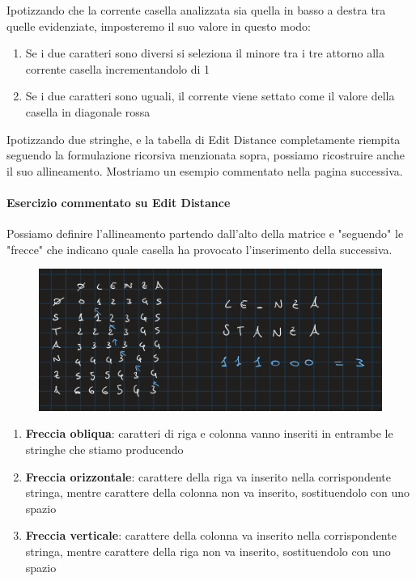\documentclass{article}
\begin{document}
Ipotizzando che la corrente casella analizzata sia quella in basso a destra tra quelle evidenziate, imposteremo il suo valore in questo modo:

\begin{enumerate}
    \item Se i due caratteri sono diversi si seleziona il minore tra i tre attorno alla corrente casella incrementandolo di 1
    \item Se i due caratteri sono uguali, il corrente viene settato come il valore della casella in diagonale rossa
\end{enumerate}

Ipotizzando due stringhe, e la tabella di Edit Distance completamente riempita seguendo la formulazione ricorsiva menzionata sopra, possiamo ricostruire anche il suo allineamento. Mostriamo un esempio commentato nella pagina successiva.

\newpage

\paragraph{Esercizio commentato su Edit Distance} 

Possiamo definire l'allineamento partendo dall'alto della matrice e "seguendo" le "frecce" che indicano quale casella ha provocato l'inserimento della successiva.

\begin{figure}[htbp]
        \center
        \includegraphics[scale=0.3]{img/esempioEditDistance.png}
\end{figure}

\begin{enumerate}
    \item \textbf{Freccia obliqua}: caratteri di riga e colonna vanno inseriti in entrambe le stringhe che stiamo producendo
    \item \textbf{Freccia orizzontale}: carattere della riga va inserito nella corrispondente stringa, mentre carattere della colonna non va inserito, sostituendolo con uno spazio
    \item \textbf{Freccia verticale}: carattere della colonna va inserito nella corrispondente stringa, mentre carattere della riga non va inserito, sostituendolo con uno spazio
\end{enumerate}
\end{document}
